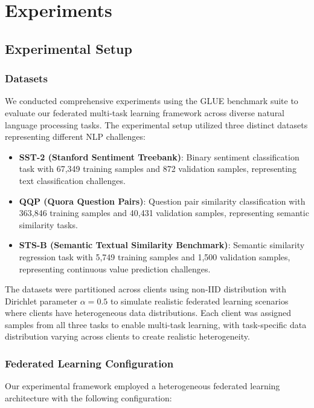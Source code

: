 \section{Experiments}

\subsection{Experimental Setup}

\subsubsection{Datasets}
We conducted comprehensive experiments using the GLUE benchmark suite to evaluate our federated multi-task learning framework across diverse natural language processing tasks. The experimental setup utilized three distinct datasets representing different NLP challenges:

\begin{itemize}
    \item \textbf{SST-2 (Stanford Sentiment Treebank)}: Binary sentiment classification task with 67,349 training samples and 872 validation samples, representing text classification challenges.
    \item \textbf{QQP (Quora Question Pairs)}: Question pair similarity classification with 363,846 training samples and 40,431 validation samples, representing semantic similarity tasks.
    \item \textbf{STS-B (Semantic Textual Similarity Benchmark)}: Semantic similarity regression task with 5,749 training samples and 1,500 validation samples, representing continuous value prediction challenges.
\end{itemize}

The datasets were partitioned across clients using non-IID distribution with Dirichlet parameter $\alpha = 0.5$ to simulate realistic federated learning scenarios where clients have heterogeneous data distributions. Each client was assigned samples from all three tasks to enable multi-task learning, with task-specific data distribution varying across clients to create realistic heterogeneity.

\subsubsection{Federated Learning Configuration}
Our experimental framework employed a heterogeneous federated learning architecture with the following configuration:

